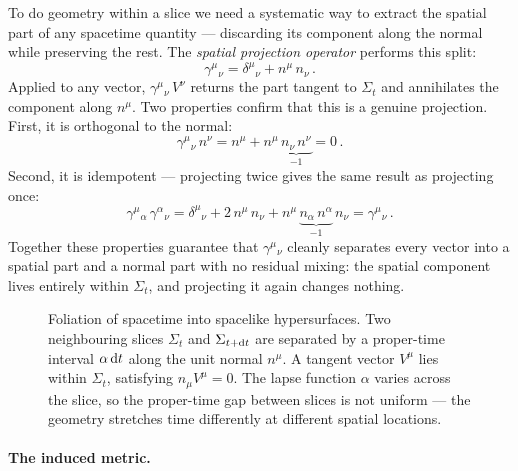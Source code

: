 To do geometry within a slice we need a systematic way to extract the
spatial part of any spacetime quantity --- discarding its component along
the normal while preserving the rest.  The \emph{spatial projection
operator} performs this split:
%
\begin{equation}
  \gamma^\mu{}_\nu = \delta^\mu{}_\nu + n^\mu\,n_\nu \,.
  \label{eq:adm-projector}
\end{equation}
%
Applied to any vector, $\gamma^\mu{}_\nu\,V^\nu$ returns the part tangent
to $\Sigma_t$ and annihilates the component along $n^\mu$.  Two properties
confirm that this is a genuine projection.  First, it is orthogonal to the
normal:
%
\begin{equation}
  \gamma^\mu{}_\nu\,n^\nu
  = n^\mu + n^\mu\,\underbrace{n_\nu\,n^\nu}_{-1} = 0 \,.
  \label{eq:adm-projector-orthogonal}
\end{equation}
%
Second, it is idempotent --- projecting twice gives the same result as
projecting once:
%
\begin{equation}
  \gamma^\mu{}_\alpha\,\gamma^\alpha{}_\nu
  = \delta^\mu{}_\nu + 2\,n^\mu\,n_\nu
    + n^\mu\,\underbrace{n_\alpha\,n^\alpha}_{-1}\,n_\nu
  = \gamma^\mu{}_\nu \,.
  \label{eq:adm-projector-idempotent}
\end{equation}
%
Together these properties guarantee that $\gamma^\mu{}_\nu$ cleanly
separates every vector into a spatial part and a normal part with no
residual mixing: the spatial component lives entirely within $\Sigma_t$,
and projecting it again changes nothing.

\begin{figure}[htbp]
  \centering
  
  \caption[Foliation of spacetime into spacelike hypersurfaces]{%
    Foliation of spacetime into spacelike hypersurfaces.
    Two neighbouring slices $\Sigma_t$ and $\Sigma_{t+\mathrm{d} t}$ are
    separated by a proper-time interval $\alpha\,\mathrm{d} t$ along the unit
    normal $n^\mu$.  A tangent vector $V^\mu$ lies within $\Sigma_t$,
    satisfying $n_\mu V^\mu = 0$.  The lapse function $\alpha$ varies
    across the slice, so the proper-time gap between slices is not
    uniform --- the geometry stretches time differently at different
    spatial locations.}
  \label{fig:adm-foliation}
\end{figure}

\paragraph{The induced metric.}

